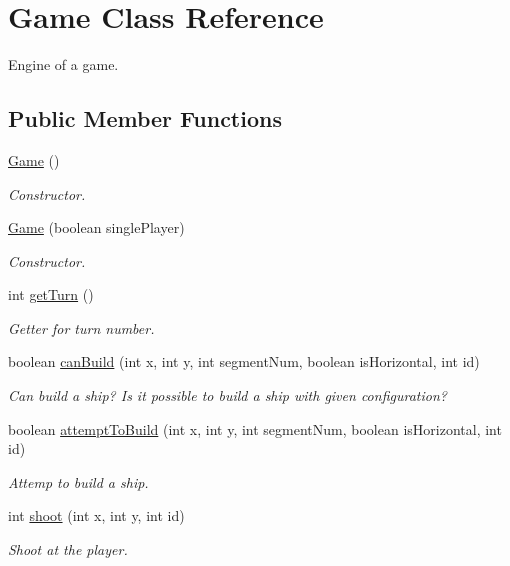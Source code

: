 \hypertarget{classGame}{}\section{Game Class Reference}
\label{classGame}


Engine of a game.  


\subsection*{Public Member Functions}
\begin{DoxyCompactItemize}
\item 
\hyperlink{classGame_a2e034e53e9c032964ecd2a831b29a616}{Game} ()
\begin{DoxyCompactList}\small\item\em Constructor. \end{DoxyCompactList}\item 
\hyperlink{classGame_acd3c40b309650b2851eef9abed5cb5c3}{Game} (boolean single\+Player)
\begin{DoxyCompactList}\small\item\em Constructor. \end{DoxyCompactList}\item 
int \hyperlink{classGame_ae518e278826e5feba6f9fc5f3818ad02}{get\+Turn} ()
\begin{DoxyCompactList}\small\item\em Getter for turn number. \end{DoxyCompactList}\item 
boolean \hyperlink{classGame_af151f3c1db692f8dc482b5ad2351c723}{can\+Build} (int x, int y, int segment\+Num, boolean is\+Horizontal, int id)
\begin{DoxyCompactList}\small\item\em Can build a ship? Is it possible to build a ship with given configuration? \end{DoxyCompactList}\item 
boolean \hyperlink{classGame_af2b475289d83fd193e7e648e0f98a69d}{attempt\+To\+Build} (int x, int y, int segment\+Num, boolean is\+Horizontal, int id)
\begin{DoxyCompactList}\small\item\em Attemp to build a ship. \end{DoxyCompactList}\item 
int \hyperlink{classGame_acdb27fef4ad28c9a9c07e7f095611f36}{shoot} (int x, int y, int id)
\begin{DoxyCompactList}\small\item\em Shoot at the player. \end{DoxyCompactList}\item 

\end{DoxyCompactItemize}
